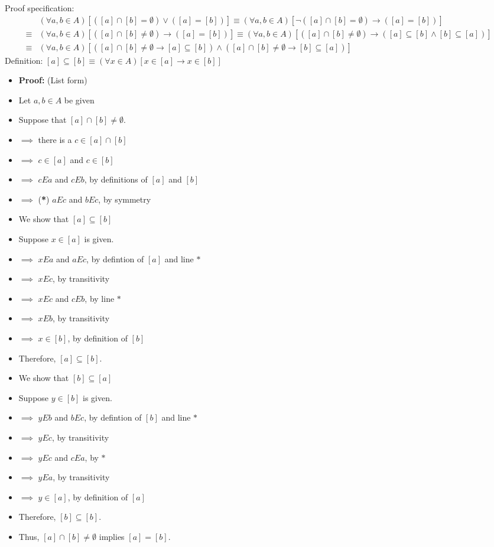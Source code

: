 \begin{Solution}{10.9}
Proof specification:
\begin{align*}
  &(\forall a,b\in A)\left[([a]\cap[b]=\emptyset) \lor  ([a]=[b])\right] \equiv   (\forall a,b\in A)\left[\lnot([a]\cap[b]=\emptyset) \rightarrow  ([a]=[b])\right]  \\
\equiv & (\forall a,b\in A)\left[([a]\cap[b]\ne\emptyset) \rightarrow  ([a]=[b])\right] \equiv  (\forall a,b\in A)\left[([a]\cap[b]\ne\emptyset) \rightarrow  ([a]\subseteq[b] \land [b] \subseteq[a])\right] \\
\equiv &  (\forall a,b\in A)\left[\left([a]\cap[b]\ne\emptyset \rightarrow  [a]\subseteq[b]\right) \land \left([a]\cap[b]\ne\emptyset \rightarrow  [b] \subseteq[a]\right)\right]
\end{align*}
Definition: $[a]\subseteq [b] \equiv (\forall x \in A)[x\in[a] \rightarrow x\in[b]]$
\begin{itemize}[noitemsep, label=$\blacktriangleright$]
    \item \textbf{Proof:} (List form)
    \item Let $a,b \in A$ be given
    \item Suppose that $[a] \cap [b] \ne \emptyset$.
    \item $\implies$ there is a $c \in [a]\cap[b]$
    \item $\implies$ $c\in[a]$ and $c\in[b]$
   \item $\implies$ $cEa$ and $cEb$, by definitions of $[a]$ and $[b]$
   \item  $\implies$ (\textbf{*}) $aEc$ and $bEc$, by symmetry
    \item We show that $[a]\subseteq[b]$
    \item \quad Suppose $x \in [a]$ is given.
    \item \quad $\implies$ $xEa$ and $aEc$, by defintion of $[a]$ and line $*$
    \item \quad $\implies$ $xEc$, by transitivity
   \item \quad $\implies$ $xEc$ and $cEb$, by line $*$
   \item \quad $\implies$ $xEb$, by transitivity
   \item \quad $\implies$ $x \in[b]$, by definition of $[b]$
   \item  Therefore, $[a] \subseteq [b]$.
   \item  We show that $[b]\subseteq[a]$
    \item \quad Suppose $y \in [b]$ is given.
    \item \quad $\implies$ $yEb$ and $bEc$, by defintion of $[b]$ and line $*$
    \item \quad $\implies$ $yEc$, by transitivity
   \item \quad $\implies$ $yEc$ and $cEa$, by $*$
   \item \quad $\implies$ $yEa$, by transitivity
   \item \quad $\implies$ $y \in[a]$, by definition of $[a]$
   \item  Therefore, $[b] \subseteq [b]$.
  \item Thus, $[a] \cap [b] \ne \emptyset$ implies $[a]=[b]$.
\end{itemize}
\end{Solution}

